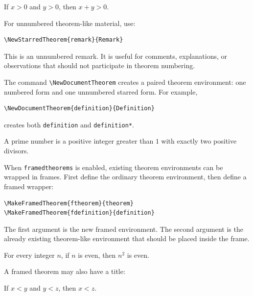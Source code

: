 \documentclass[a4paper,11pt]{article}
\begin{document}
\begin{lemma}
If $x>0$ and $y>0$, then $x+y>0$.
\end{lemma}

For unnumbered theorem-like material, use:

\begin{verbatim}
\NewStarredTheorem{remark}{Remark}
\end{verbatim}

\begin{remark}
This is an unnumbered remark.  It is useful for comments, explanations, or
observations that should not participate in theorem numbering.
\end{remark}

The command \verb|\NewDocumentTheorem| creates a paired theorem environment:
one numbered form and one unnumbered starred form.  For example,

\begin{verbatim}
\NewDocumentTheorem{definition}{Definition}
\end{verbatim}

creates both \verb|definition| and \verb|definition*|.

\begin{definition}
A prime number is a positive integer greater than $1$ with exactly two positive
divisors.
\end{definition}

When \verb|framedtheorems| is enabled, existing theorem environments can be
wrapped in frames.  First define the ordinary theorem environment, then define
a framed wrapper:

\begin{verbatim}
\MakeFramedTheorem{ftheorem}{theorem}
\MakeFramedTheorem{fdefinition}{definition}
\end{verbatim}

The first argument is the new framed environment.  The second argument is the
already existing theorem-like environment that should be placed inside the
frame.

\begin{ftheorem}
For every integer $n$, if $n$ is even, then $n^2$ is even.
\end{ftheorem}

A framed theorem may also have a title:

\begin{ftheorem}[Transitivity]
If $x<y$ and $y<z$, then $x<z$.
\end{ftheorem}
\end{document}
